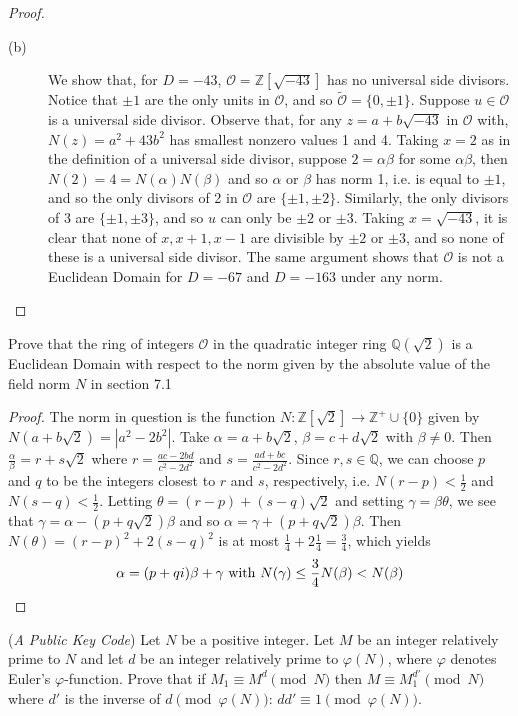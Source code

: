 \documentclass[12pt,leqno]{book}
\numberwithin{equation}{section}
\newcommand{\question}[2] {\vspace{.25in}\noindent\fbox{#1} #2 \vspace{.10in}}
\theoremstyle{definition}
\begin{document}
\begin{proof}
\begin{description}
\item[(b)] We show that, for $D=-43$, $\mathcal{O}=\mathbb{Z}[\sqrt{-43}]$ has no universal side divisors. Notice that $\pm1$ are the only units in $\mathcal{O}$, and so $\widetilde{\mathcal{O}}=\{0,\pm1\}$. Suppose $u\in\mathcal{O}$ is a universal side divisor. Observe that, for any $z=a+b\sqrt{-43}$ in $\mathcal{O}$ with, $N(z)=a^2+43b^2$ has smallest nonzero values 1 and 4. Taking $x=2$ as in the definition of a universal side divisor, suppose $2=\alpha\beta$ for some $\alpha\beta$, then $N(2)=4=N(\alpha)N(\beta)$ and so $\alpha$ or $\beta$ has norm 1, i.e. is equal to $\pm1$, and so the only divisors of 2 in $\mathcal{O}$ are $\{\pm1,\pm2\}$. Similarly, the only divisors of 3 are $\{\pm1,\pm3\}$, and so $u$ can only be $\pm2$ or $\pm3$. Taking $x=\sqrt{-43}$, it is clear that none of $x,x+1,x-1$ are divisible by $\pm2$ or $\pm3$, and so none of these is a universal side divisor. The same argument shows that $\mathcal{O}$ is not a Euclidean Domain for $D=-67$ and $D=-163$ under any norm.\qedhere
\end{description}

\end{proof}

\question{9}{Prove that the ring of integers $\mathcal{O}$ in the quadratic integer ring $\mathbb{Q}(\sqrt{2})$ is a Euclidean Domain with respect to the norm given by the absolute value of the field norm $N$ in section 7.1}

\begin{proof}
 The norm in question is the function $N:\mathbb{Z}[\sqrt{2}]\to\mathbb{Z}^+\cup\{0\}$ given by $N(a+b\sqrt{2})=|a^2-2b^2|$. Take $\alpha=a+b\sqrt{2}$, $\beta=c+d\sqrt{2}$ with $\beta\not=0$. Then $\frac{\alpha}{\beta}=r+s\sqrt{2}$ where $r=\frac{ac-2bd}{c^2-2d^2}$ and $s=\frac{ad+bc}{c^2-2d^2}$. Since $r,s\in\mathbb{Q}$, we can choose $p$ and $q$ to be the integers closest to $r$ and $s$, respectively, i.e. $N(r-p)<\frac{1}{2}$ and $N(s-q)<\frac{1}{2}$. Letting $\theta=(r-p)+(s-q)\sqrt{2}$ and setting $\gamma=\beta\theta$, we see that $\gamma=\alpha-(p+q\sqrt{2})\beta$ and so $\alpha=\gamma+(p+q\sqrt{2})\beta$. Then $N(\theta)=(r-p)^2+2(s-q)^2$ is at most $\frac{1}{4}+2\frac{1}{4}=\frac{3}{4}$, which yields\[\alpha=(p+qi)\beta+\gamma\text{ with }N(\gamma)\leq\frac{3}{4}N(\beta)<N(\beta)\qedhere\]
\end{proof}


\question{12}{(\textit{A Public Key Code}) Let $N$ be a positive integer. Let $M$ be an integer relatively prime to $N$ and let $d$ be an integer relatively prime to $\varphi(N)$, where $\varphi$ denotes Euler's $\varphi$-function. Prove that if $M_1\equiv M^d\pmod{N}$ then $M\equiv M_1^{d'}\pmod{N}$ where $d'$ is the inverse of $d\pmod{\varphi(N)}$: $dd'\equiv1\pmod{\varphi(N)}$.}
\end{document}

